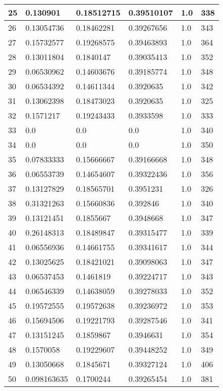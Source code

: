\begin{longtable}{|l|l|l|l|l|l|}
25 & 0.130901 & 0.18512715 & 0.39510107 & 1.0 & 338 \\ \hline 
26 & 0.13054736 & 0.18462281 & 0.39267656 & 1.0 & 343 \\ \hline 
27 & 0.15732577 & 0.19268575 & 0.39463893 & 1.0 & 364 \\ \hline 
28 & 0.13011804 & 0.1840147 & 0.39035413 & 1.0 & 352 \\ \hline 
29 & 0.06530962 & 0.14603676 & 0.39185774 & 1.0 & 348 \\ \hline 
30 & 0.06534392 & 0.14611344 & 0.3920635 & 1.0 & 342 \\ \hline 
31 & 0.13062398 & 0.18473023 & 0.3920635 & 1.0 & 325 \\ \hline 
32 & 0.1571217 & 0.19243433 & 0.3933598 & 1.0 & 333 \\ \hline 
33 & 0.0 & 0.0 & 0.0 & 1.0 & 340 \\ \hline 
34 & 0.0 & 0.0 & 0.0 & 1.0 & 350 \\ \hline 
35 & 0.07833333 & 0.15666667 & 0.39166668 & 1.0 & 348 \\ \hline 
36 & 0.06553739 & 0.14654607 & 0.39322436 & 1.0 & 356 \\ \hline 
37 & 0.13127829 & 0.18565701 & 0.3951231 & 1.0 & 326 \\ \hline 
38 & 0.31321263 & 0.15660836 & 0.392846 & 1.0 & 340 \\ \hline 
39 & 0.13121451 & 0.1855667 & 0.3948668 & 1.0 & 347 \\ \hline 
40 & 0.26148313 & 0.18489847 & 0.39315477 & 1.0 & 339 \\ \hline 
41 & 0.06556936 & 0.14661755 & 0.39341617 & 1.0 & 344 \\ \hline 
42 & 0.13025625 & 0.18421021 & 0.39098063 & 1.0 & 347 \\ \hline 
43 & 0.06537453 & 0.1461819 & 0.39224717 & 1.0 & 343 \\ \hline 
44 & 0.06546339 & 0.14638059 & 0.39278033 & 1.0 & 352 \\ \hline 
45 & 0.19572555 & 0.19572638 & 0.39236972 & 1.0 & 353 \\ \hline 
46 & 0.15694506 & 0.19221793 & 0.39287546 & 1.0 & 341 \\ \hline 
47 & 0.13151245 & 0.1859867 & 0.3946631 & 1.0 & 354 \\ \hline 
48 & 0.1570058 & 0.19229607 & 0.39448252 & 1.0 & 349 \\ \hline 
49 & 0.13050668 & 0.1845671 & 0.39327124 & 1.0 & 406 \\ \hline 
50 & 0.098163635 & 0.1700244 & 0.39265454 & 1.0 & 381 \\ \hline 
\end{longtable}